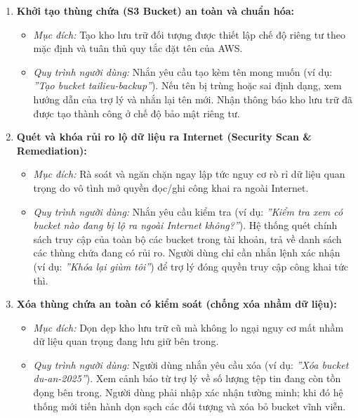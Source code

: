 \documentclass[a4paper,12pt]{article}
\begin{document}
\begin{enumerate}
  \item \textbf{Khởi tạo thùng chứa (S3 Bucket) an toàn và chuẩn hóa:}
  \begin{itemize}
    \item \textit{Mục đích:} Tạo kho lưu trữ đối tượng được thiết lập chế độ riêng tư theo mặc định và tuân thủ quy tắc đặt tên của AWS.
    \item \textit{Quy trình người dùng:} Nhắn yêu cầu tạo kèm tên mong muốn (ví dụ: \textit{''Tạo bucket tailieu-backup''}). Nếu tên bị trùng hoặc sai định dạng, xem hướng dẫn của trợ lý và nhắn lại tên mới. Nhận thông báo kho lưu trữ đã được tạo thành công ở chế độ bảo mật riêng tư.
  \end{itemize}

  \item \textbf{Quét và khóa rủi ro lộ dữ liệu ra Internet (Security Scan \& Remediation):}
  \begin{itemize}
    \item \textit{Mục đích:} Rà soát và ngăn chặn ngay lập tức nguy cơ rò rỉ dữ liệu quan trọng do vô tình mở quyền đọc/ghi công khai ra ngoài Internet.
    \item \textit{Quy trình người dùng:} Nhắn yêu cầu kiểm tra (ví dụ: \textit{''Kiểm tra xem có bucket nào đang bị lộ ra ngoài Internet không?''}). Hệ thống quét chính sách truy cập của toàn bộ các bucket trong tài khoản, trả về danh sách các thùng chứa đang có rủi ro. Người dùng chỉ cần nhắn lệnh xác nhận (ví dụ: \textit{''Khóa lại giùm tôi''}) để trợ lý đóng quyền truy cập công khai tức thì.
  \end{itemize}

  \item \textbf{Xóa thùng chứa an toàn có kiểm soát (chống xóa nhầm dữ liệu):}
  \begin{itemize}
    \item \textit{Mục đích:} Dọn dẹp kho lưu trữ cũ mà không lo ngại nguy cơ mất nhầm dữ liệu quan trọng đang lưu giữ bên trong.
    \item \textit{Quy trình người dùng:} Người dùng nhắn yêu cầu xóa (ví dụ: \textit{''Xóa bucket du-an-2025''}). Xem cảnh báo từ trợ lý về số lượng tệp tin đang còn tồn đọng bên trong. Người dùng phải nhập xác nhận tường minh; khi đó hệ thống mới tiến hành dọn sạch các đối tượng và xóa bỏ bucket vĩnh viễn.
  \end{itemize}


\end{enumerate}
\end{document}
